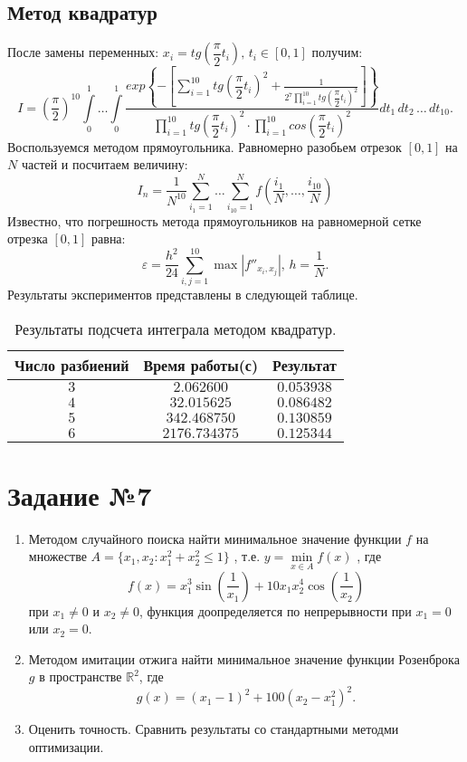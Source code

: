 \documentclass[a4paper, 11pt]{article}
\theoremstyle{def}
\theoremstyle{th}
\theoremstyle{rem}
\newcommand{\R}{\mathbb{R}}
\begin{document}
\subsection{Метод квадратур}
После замены переменных: $x_i = tg\left(\dfrac{\pi}{2}t_i\right), \,t_i\in[0, 1]$ получим:
$$
I = \left(\frac{\pi}{2}\right)^{10}\int\limits_0^1\dots\int\limits_0^1\frac{exp\left\{-\left[\sum\limits_{i=1}^{10}tg\left(\dfrac{\pi}{2}t_i\right)^2 + \frac{1}{2^7 \prod\limits_{i=1}^{10}tg\left(\dfrac{\pi}{2}t_i\right)^2}\right]\right\}}{\prod\limits_{i=1}^{10}tg\left(\dfrac{\pi}{2}t_i\right)^2 \cdot \prod\limits_{i=1}^{10}cos\left(\dfrac{\pi}{2}t_i\right)^2}dt_1\,dt_2\,\dots\,dt_{10}.
$$
Воспользуемся методом прямоугольника. Равномерно разобьем отрезок $[0, 1]$ на $N$ частей и посчитаем величину:
$$
I_n = \frac{1}{N^{10}}\sum\limits_{i_1=1}^{N}\dots\sum\limits_{i_{10}=1}^N f\left(\frac{i_1}{N},\dots,\frac{i_{10}}{N}\right)
$$
Известно, что погрешность метода прямоугольников на равномерной сетке отрезка $[0, 1]$ равна:
$$
\varepsilon = \frac{h^2}{24}\sum\limits_{i, j = 1}^{10}\max|f''_{x_i, x_j}|, \, h = \frac{1}{N}.
$$
Результаты экспериментов представлены в следующей таблице.
\begin{table}[h]
\begin{center}
\begin{tabular}{|c|c|c|}
\hline
Число разбиений &
Время работы(с)  &
Результат
\\
\hline
$3$
&
$2.062600$
&
$0.053938$
\\
\hline
$4$
&
$32.015625$
&
$0.086482$
\\
\hline
$5$
&
$342.468750$
&
$0.130859$
\\
\hline
$6$
&
$2176.734375$
&
$0.125344$
\\
\hline
\end{tabular}
\end{center}
\caption{Результаты подсчета интеграла методом квадратур.}
\end{table}

\section{Задание №7}

\begin{enumerate}
        \item Методом случайного поиска найти минимальное значение функции
$
        f
$ 
        на множестве 
$
        A = \{x_1, x_2 : x_1^2 + x_2^2 \leqslant 1\}
$
        , т.е.
$
        y = \min\limits_{x \in A} f(x)
$
        , где 
$$
        f(x) = x_1^3\sin\left(\frac{1}{x_1}\right) +10x_1 x_2^4\cos\left(\frac{1}{x_2}\right)
$$
        при $x_1 \neq 0$ и $x_2 \neq 0$, функция доопределяется по непрерывности при $x_1 = 0$ или $x_2 = 0$.
        
        \item Методом имитации отжига найти минимальное значение функции Розенброка $g$ в пространстве $\R^2$, где 
$$
        g(x) = (x_1-1)^2+100(x_2-x_1^2)^2.
$$

        \item Оценить точность. Сравнить результаты со стандартными методми оптимизации.
\end{enumerate}
\end{document}
